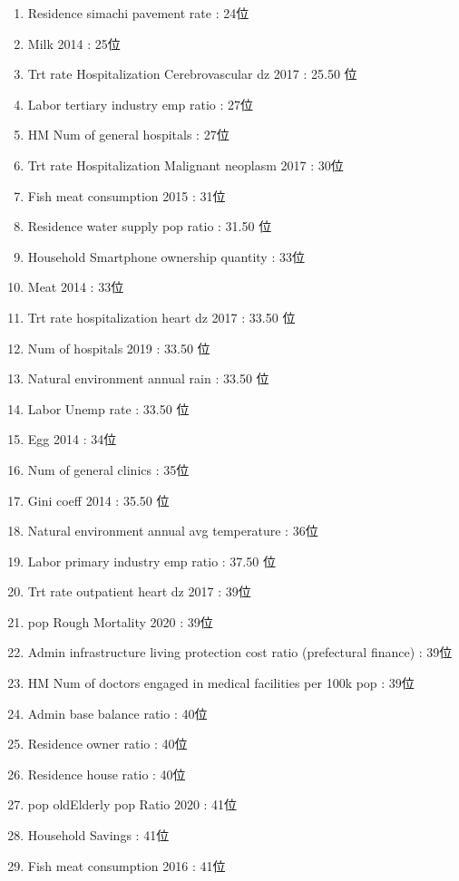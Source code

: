 \begin{multicols}{2}
\begin{enumerate}
	\item Residence simachi pavement rate : 24位
	\item Milk 2014 : 25位
	\item Trt rate Hospitalization Cerebrovascular dz 2017 : 25.50 位
	\item Labor tertiary industry emp ratio : 27位
	\item HM Num of general hospitals : 27位
	\item Trt rate Hospitalization Malignant neoplasm 2017 : 30位
	\item Fish meat consumption 2015 : 31位
	\item Residence water supply pop ratio : 31.50 位
	\item Household Smartphone ownership quantity : 33位
	\item Meat 2014 : 33位
	\item Trt rate hospitalization heart dz 2017 : 33.50 位
	\item Num of hospitals 2019 : 33.50 位
	\item Natural environment annual rain : 33.50 位
	\item Labor Unemp rate : 33.50 位
	\item Egg 2014 : 34位
	\item Num of general clinics : 35位
	\item Gini coeff 2014 : 35.50 位
	\item Natural environment annual avg temperature : 36位
	\item Labor primary industry emp ratio : 37.50 位
	\item Trt rate outpatient heart dz 2017 : 39位
	\item pop Rough Mortality 2020 : 39位
	\item Admin infrastructure living protection cost ratio (prefectural finance) : 39位
	\item HM Num of doctors engaged in medical facilities per 100k pop : 39位
	\item Admin base balance ratio : 40位
	\item Residence owner ratio : 40位
	\item Residence house ratio : 40位
	\item pop oldElderly pop Ratio 2020 : 41位
	\item Household Savings : 41位
	\item Fish meat consumption 2016 : 41位

\end{enumerate}
\end{multicols}
